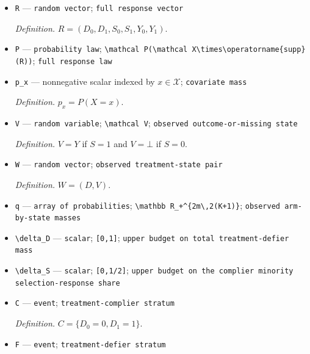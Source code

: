 \documentclass{article}
\begin{document}
\begin{itemize}
  \par\smallskip\noindent\emph{Definition.} \(Y_1=Y(1)\).
  \item \texttt{R} --- \texttt{random vector}; \texttt{full response vector}
  \par\smallskip\noindent\emph{Definition.} \(R=(D_0,D_1,S_0,S_1,Y_0,Y_1)\).
  \item \texttt{P} --- \texttt{probability law}; \texttt{\textbackslash{}\allowbreak{}mathcal P(\textbackslash{}\allowbreak{}mathcal X\textbackslash{}\allowbreak{}times\textbackslash{}\allowbreak{}operatorname\{supp\}\allowbreak{}(R))}; \texttt{full response law}
  \item \texttt{p\_\allowbreak{}x} --- nonnegative scalar indexed by \(x\in\mathcal X\); \texttt{covariate mass}
  \par\smallskip\noindent\emph{Definition.} \(p_x=P(X=x)\).
  \item \texttt{V} --- \texttt{random variable}; \texttt{\textbackslash{}\allowbreak{}mathcal V}; \texttt{observed outcome-\allowbreak{}or-\allowbreak{}missing state}
  \par\smallskip\noindent\emph{Definition.} \(V=Y\) if \(S=1\) and \(V=\bot\) if \(S=0\).
  \item \texttt{W} --- \texttt{random vector}; \texttt{observed treatment-\allowbreak{}state pair}
  \par\smallskip\noindent\emph{Definition.} \(W=(D,V)\).
  \item \texttt{q} --- \texttt{array of probabilities}; \texttt{\textbackslash{}\allowbreak{}mathbb R\_\allowbreak{}+\allowbreak{}\textasciicircum{}\{2m\textbackslash{}\allowbreak{},\allowbreak{}2(K+\allowbreak{}1)\}\allowbreak{}}; \texttt{observed arm-\allowbreak{}by-\allowbreak{}state masses}
  \item \texttt{\textbackslash{}\allowbreak{}delta\_\allowbreak{}D} --- \texttt{scalar}; \texttt{[0,\allowbreak{}1]}; \texttt{upper budget on total treatment-\allowbreak{}defier mass}
  \item \texttt{\textbackslash{}\allowbreak{}delta\_\allowbreak{}S} --- \texttt{scalar}; \texttt{[0,\allowbreak{}1/\allowbreak{}2]}; \texttt{upper budget on the complier minority selection-\allowbreak{}response share}
  \item \texttt{C} --- \texttt{event}; \texttt{treatment-\allowbreak{}complier stratum}
  \par\smallskip\noindent\emph{Definition.} \(C=\{D_0=0,D_1=1\}\).
  \item \texttt{F} --- \texttt{event}; \texttt{treatment-\allowbreak{}defier stratum}

\end{itemize}
\end{document}
